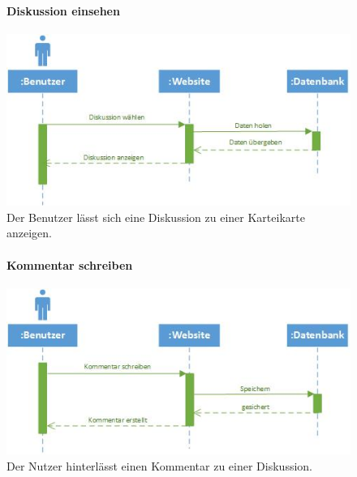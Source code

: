 \documentclass[12pt,a4paper]{article}
\begin{document}
\begin{figure}[H]
	\centering
	\paragraph{Diskussion einsehen}
	\includegraphics[width=\textwidth]{Bilder/Sequenzdiagramme/DiskussionEinsehen1.jpg}
	\caption{Der Benutzer lässt sich eine Diskussion zu einer Karteikarte anzeigen.}
	\label{SzDiskussionEinsehen}
\end{figure}
\begin{figure}[H]
	\centering
	\paragraph{Kommentar schreiben}
	\includegraphics[width=\textwidth]{Bilder/Sequenzdiagramme/KommentarSchreiben1.jpg}
	\caption{Der Nutzer hinterlässt einen Kommentar zu einer Diskussion.}
	\label{SzKommentarSchreiben}
\end{figure}
\end{document}
